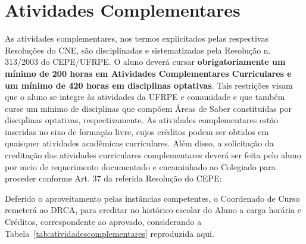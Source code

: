 \documentclass[
	12pt,				%
	openright,			%
  oneside,     %
	a4paper,			%
	english,			%
	french,				%
	spanish,			%
	brazil				%
	]{abntex2}
\begin{document}
\chapter{Atividades Complementares}
As atividades complementares,  nos termos explicitados pelas respectivas
Resoluções do CNE, são disciplinadas  e sistematizadas pela Resolução n.
313/2003 do CEPE/UFRPE. O aluno deverá cursar  \textbf{obrigatoriamente um
mínimo de 200 horas em Atividades Complementares Curriculares e um mínimo de  420 horas em
disciplinas optativas}. Tais restrições visam que o aluno se integre  às atividades da UFRPE e comunidade e
que também curse um mínimo de disciplinas  que compõem Áreas de Saber
constituídas por disciplinas optativas,  respectivamente. As atividades
complementares estão inseridas no eixo de  formação livre, cujos créditos podem
ser obtidos em quaisquer atividades acadêmicas  curriculares. Além disso, a
solicitação da creditação das atividades curriculares  complementares deverá ser
feita pelo aluno por meio de requerimento documentado e  encaminhado ao
Colegiado para proceder conforme Art. 37 da referida  Resolução do CEPE:

Deferido o aproveitamento pelas instâncias competentes,  o Coordenado de Curso
remeterá ao DRCA, para creditar no histórico escolar do  Aluno a carga horária e
Créditos, correspondente ao aprovado, considerando a Tabela~\ref{tab:atividadescomplementares} reproduzida aqui.

\end{document}
